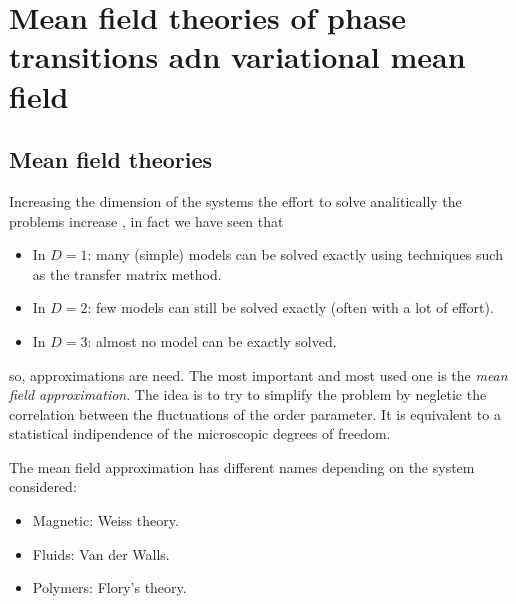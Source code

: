 \documentclass[../main/main.tex]{subfiles}
\begin{document}
\chapter{Mean field theories of phase transitions adn variational mean field}

\section{Mean field theories}

Increasing the dimension of the systems the effort to solve analitically the problems increase , in fact we have seen that
\begin{itemize}
\item In \( D=1 \): many (simple) models can be solved exactly using techniques such as the transfer matrix method.
\item In \( D=2 \): few models can still be solved exactly (often with a lot of effort).
\item In \( D=3 \): almost no model can be exactly solved.
\end{itemize}
so, approximations are need.
The most important and most used one is the \emph{mean field approximation}. The idea is to try to simplify the problem by negletic the correlation between the fluctuations of the order parameter. It is equivalent to a statistical indipendence of the microscopic degrees of freedom.

The mean field approximation has different names depending on the system considered:
\begin{itemize}
\item Magnetic: Weiss theory.
\item Fluids: Van der Walls.
\item Polymers: Flory's theory.
\end{itemize}
\end{document}
